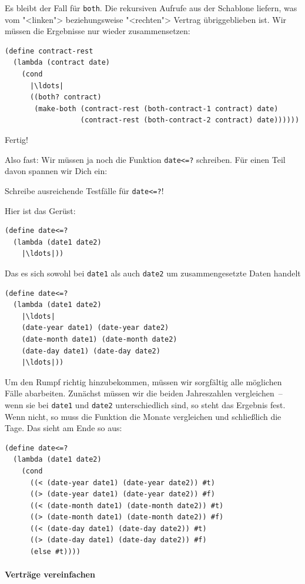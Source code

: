 Es bleibt der Fall für \lstinline{both}.  Die rekursiven Aufrufe aus der
Schablone liefern, was vom "<linken"> beziehungsweise "<rechten">
Vertrag übriggeblieben ist.  Wir müssen die Ergebnisse nur wieder
zusammensetzen:
%
\begin{lstlisting}
(define contract-rest
  (lambda (contract date)
    (cond
      |\ldots|
      ((both? contract)
       (make-both (contract-rest (both-contract-1 contract) date)
                  (contract-rest (both-contract-2 contract) date))))))
\end{lstlisting}
%
Fertig!

Also fast: Wir müssen ja noch die Funktion \lstinline{date<=?}
schreiben.  Für einen Teil davon spannen wir Dich ein:
%
\begin{aufgabeinline}
  Schreibe ausreichende Testfälle für \lstinline{date<=?}!
\end{aufgabeinline}
%
Hier ist das Gerüst:
%
\begin{lstlisting}
(define date<=?
  (lambda (date1 date2)
    |\ldots|))
\end{lstlisting}    
%
Das es sich sowohl bei \lstinline{date1} als auch \lstinline{date2} um
zusammengesetzte Daten handelt
%
\begin{lstlisting}
(define date<=?
  (lambda (date1 date2)
    |\ldots|
    (date-year date1) (date-year date2)
    (date-month date1) (date-month date2)
    (date-day date1) (date-day date2)
    |\ldots|))
\end{lstlisting}    
%
Um den Rumpf richtig hinzubekommen, müssen wir sorgfältig alle
möglichen Fälle abarbeiten.  Zunächst müssen wir die beiden
Jahreszahlen vergleichen~-- wenn sie bei \lstinline{date1} und
\lstinline{date2} unterschiedlich sind, so steht das Ergebnis fest.
Wenn nicht, so muss die Funktion die Monate vergleichen und
schließlich die Tage.  Das sieht am Ende so aus:
%
\begin{lstlisting}
(define date<=?
  (lambda (date1 date2)
    (cond
      ((< (date-year date1) (date-year date2)) #t)
      ((> (date-year date1) (date-year date2)) #f)
      ((< (date-month date1) (date-month date2)) #t)
      ((> (date-month date1) (date-month date2)) #f)
      ((< (date-day date1) (date-day date2)) #t)
      ((> (date-day date1) (date-day date2)) #f)
      (else #t))))
\end{lstlisting}
    
\paragraph{Verträge vereinfachen}

